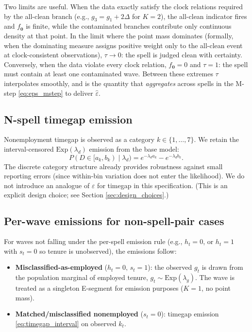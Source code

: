 \documentclass[12pt]{article}
\begin{document}
Two limits are useful. When the data exactly satisfy the clock relations
required by the all-clean branch (e.g., \(g_3 = g_1 + 2\Delta\) for
\(K=2\)), the all-clean indicator fires and \(f_{\mathbf{0}}\) is
finite, while the contaminated branches contribute only continuous
density at that point. In the limit where the point mass dominates
(formally, when the dominating measure assigns positive weight only to
the all-clean event at clock-consistent observations),
\(\tau \to 0\): the spell is judged clean with certainty. Conversely,
when the data violate every clock relation, \(f_{\mathbf{0}} = 0\) and
\(\tau = 1\): the spell must contain at least one contaminated wave.
Between these extremes \(\tau\) interpolates smoothly, and is the
quantity that \emph{aggregates} across spells in the M-step
\eqref{eq:eps_mstep} to deliver \(\hat\varepsilon\).

\subsection{N-spell timegap emission}

Nonemployment timegap is observed as a category \(k \in \{1,\dots,7\}\).
We retain the interval-censored \(\mathrm{Exp}(\lambda_d)\) emission from
the base model:
\begin{equation}
P(D \in [a_k, b_k) \mid \lambda_d) = e^{-\lambda_d a_k} - e^{-\lambda_d b_k}.
\label{eq:timegap_interval}
\end{equation}
The discrete category structure already provides robustness against small
reporting errors (since within-bin variation does not enter the likelihood).
We do not introduce an analogue of \(\varepsilon\) for timegap in this
specification. (This is an explicit design choice; see Section
\ref{sec:design_choices}.)

\subsection{Per-wave emissions for non-spell-pair cases}

For waves not falling under the per-spell emission rule (e.g., \(h_t=0\),
or \(h_t=1\) with \(s_t=0\) so tenure is unobserved), the emissions follow:

\begin{itemize}
\item \textbf{Misclassified-as-employed} (\(h_t=0,\,s_t=1\)): the observed
  \(g_t\) is drawn from the population marginal of employed tenure,
  \(g_t \sim \mathrm{Exp}(\lambda_g)\). The wave is treated as a singleton
  E-segment for emission purposes (\(K=1\), no point mass).
\item \textbf{Matched/misclassified nonemployed} (\(s_t=0\)): timegap
  emission \eqref{eq:timegap_interval} on observed \(k_{t}\).
\end{itemize}
\end{document}
